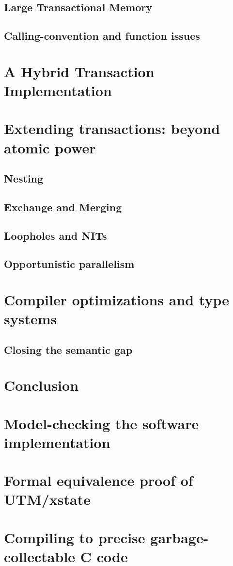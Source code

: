 \documentclass{phd-thesis}
\begin{document}
\section{Large Transactional Memory}
\section{Calling-convention and function issues}

\chapter{A Hybrid Transaction Implementation}\label{sec:hybrid}


\chapter[Extending transactions]{Extending transactions: beyond atomic power}

\section{Nesting}
\section{Exchange and Merging}
\section{Loopholes and NITs}
\section{Opportunistic parallelism}

\chapter[Optimizations and type systems]{Compiler optimizations and type systems}
\section{Closing the semantic gap}\label{sec:safe-transactify}

\chapter{Conclusion}
\appendix
\chapter[Model-checking the implementation]{Model-checking the software implementation}


\chapter{Formal equivalence proof of UTM/xstate}\label{sec:hw-proof}

\chapter[Precise garbage-collectable C]{Compiling to precise garbage-collectable C code}

\backmatter

\printindex
\end{document}
